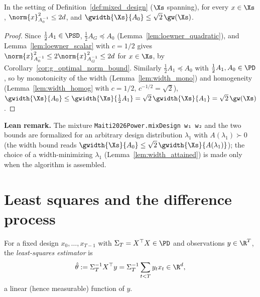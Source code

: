 \begin{lemma}\label{lem:mixed_design_bounds}
\leanok
{}
In the setting of Definition~\ref{def:mixed_design} ($\Xs$ spanning), for every $x \in \Xs$,
$\norm{x}_{A_0^{-1}}^2 \le 2d$, and $\gwidth{\Xs}{A_0} \le \sqrt2\,\gw(\Xs)$.
\end{lemma}

\begin{proof}
\leanok
{}
Since $\frac12A_1 \in \PSD$, $\frac12A_G \preceq A_0$ (Lemma~\ref{lem:loewner_quadratic}), and
Lemma~\ref{lem:loewner_scalar} with $c = 1/2$ gives $\norm{x}_{A_0^{-1}}^2 \le 2\norm{x}_{A_G^{-1}}^2
\le 2d$ for $x \in \Xs$, by Corollary~\ref{cor:g_optimal_norm_bound}. Similarly
$\frac12A_1 \preceq A_0$ with $\frac12A_1, A_0 \in \PD$, so by monotonicity of the width
(Lemma~\ref{lem:width_mono}) and homogeneity (Lemma~\ref{lem:width_homog} with $c = 1/2$,
$c^{-1/2} = \sqrt2$),
$\gwidth{\Xs}{A_0} \le \gwidth{\Xs}{\tfrac12A_1} = \sqrt2\,\gwidth{\Xs}{A_1} = \sqrt2\,\gw(\Xs)$.
\end{proof}

\textbf{Lean remark.} The mixture \texttt{Maiti2026Power.mixDesign w₁ w₂} and the two bounds are
formalized for an arbitrary design distribution $\lambda_1$ with $A(\lambda_1) \succ 0$ (the
width bound reads $\gwidth{\Xs}{A_0} \le \sqrt2\,\gwidth{\Xs}{A(\lambda_1)}$); the choice of a
width-minimizing $\lambda_1$ (Lemma~\ref{lem:width_attained}) is made only when the algorithm
is assembled.

\section{Least squares and the difference process}
\label{sec:upper_ls}

\begin{definition}\label{def:least_squares}
\leanok
{}
For a fixed design $x_0,\dots,x_{T-1}$ with $\Sigma_T = X^\top X \in \PD$ and observations
$y \in \R^T$, the \emph{least-squares estimator} is
\[
  \hat\theta := \Sigma_T^{-1}X^\top y = \Sigma_T^{-1}\sum_{t<T}y_tx_t \in \R^d ,
\]
a linear (hence measurable) function of $y$.
\end{definition}

